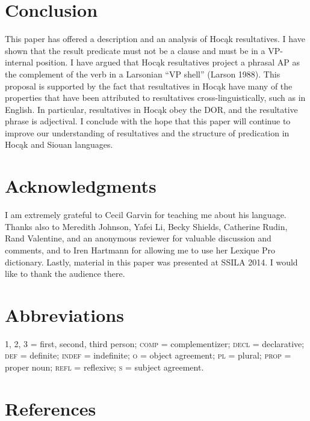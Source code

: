 \documentclass[output=paper]{LSP/langsci}
\begin{document}
\section{Conclusion}
This paper has offered a description and an analysis of Hocąk resultatives. I have shown that the result predicate must not be a clause and must be in a VP-internal position. I have argued that Hocąk resultatives project a phrasal AP as the complement of the verb in a Larsonian ``VP shell'' (Larson 1988). This proposal is supported by the fact that resultatives in Hocąk have many of the properties that have been attributed to resultatives cross-linguistically, such as in English. In particular, resultatives in Hocąk obey the DOR, and the resultative phrase is adjectival. I conclude with the hope that this paper will continue to improve our understanding of resultatives and the structure of predication in Hocąk and Siouan languages.

\section* {Acknowledgments}
I am extremely grateful to Cecil Garvin for teaching me about his language. Thanks also to Meredith Johnson, Yafei Li, Becky Shields, Catherine Rudin, Rand Valentine, and an anonymous reviewer for valuable discussion and comments, and to Iren Hartmann for allowing me to use her Lexique Pro dictionary. Lastly, material in this paper was presented at SSILA 2014. I would like to thank the audience there.

\section*{Abbreviations}
1, 2, 3 = first, second, third person; \textsc{comp} = complementizer; \textsc{decl} = declarative; \textsc{def} = definite; \textsc{indef} = indefinite; \textsc{o} = object agreement; \textsc{pl} = plural; \textsc{prop} = proper noun; \textsc{refl} = reflexive; \textsc{s} = subject agreement. 

\section*{References}

\newenvironment{reflist} {\begin{list} {} {\listparindent -.25in
\leftmargin .3in} \item \ \vspace{-.3in} } {\end{list} }
\end{document}
